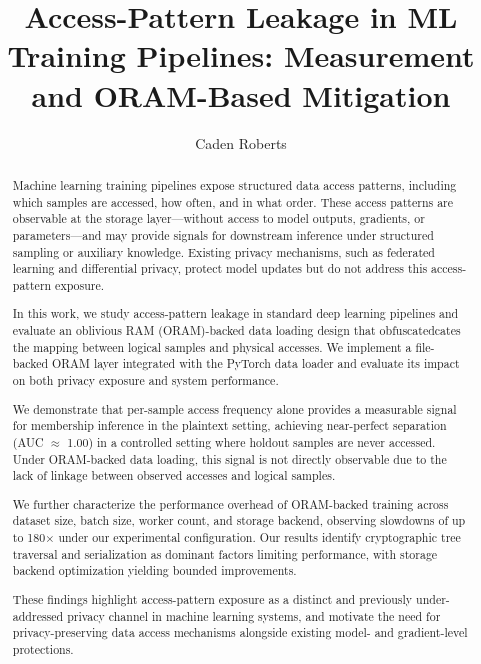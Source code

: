 \documentclass{llncs}
\begin{document}
\title{Access-Pattern Leakage in ML Training Pipelines: Measurement and ORAM-Based Mitigation}

\author{Caden Roberts}

\maketitle

\begin{abstract}
Machine learning training pipelines expose structured data access patterns, including which samples are accessed, how often, and in what order.
These access patterns are observable at the storage layer---without access to model outputs, gradients, or parameters---and may provide signals for downstream inference under structured sampling or auxiliary knowledge.
Existing privacy mechanisms, such as federated learning and differential privacy, protect model updates but do not address this access-pattern exposure.

In this work, we study access-pattern leakage in standard deep learning pipelines and evaluate an oblivious RAM (ORAM)-backed data loading design that obfuscatedcates the mapping between logical samples and physical accesses.
We implement a file-backed ORAM layer integrated with the PyTorch data loader and evaluate its impact on both privacy exposure and system performance.

We demonstrate that per-sample access frequency alone provides a measurable signal for membership inference in the plaintext setting, achieving near-perfect separation (AUC $\approx$ 1.00) in a controlled setting where holdout samples are never accessed.
Under ORAM-backed data loading, this signal is not directly observable due to the lack of linkage between observed accesses and logical samples.

We further characterize the performance overhead of ORAM-backed training across dataset size, batch size, worker count, and storage backend, observing slowdowns of up to 180$\times$ under our experimental configuration.
Our results identify cryptographic tree traversal and serialization as dominant factors limiting performance, with storage backend optimization yielding bounded improvements.

These findings highlight access-pattern exposure as a distinct and previously under-addressed privacy channel in machine learning systems, and motivate the need for privacy-preserving data access mechanisms alongside existing model- and gradient-level protections.
\end{abstract}
\end{document}
